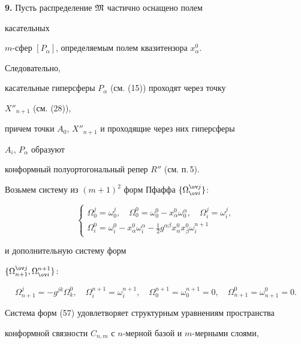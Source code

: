  


{\bf 9.} Пусть распределение $\frak M$ частично оснащено полем 


касательных 


$m$-сфер $[P_\alpha]$, определяемым полем квазитензора $x^0_\alpha$. 


Следовательно, 


касательные гиперсферы $P_\alpha$ (см. (15)) проходят через точку 


$X''_{n+1}$ (см. (28)), 


причем точки $A_0$, $X''_{n+1}$ и проходящие через них гиперсферы 


$A_i$, $P_\alpha$ образуют 


конформный полуортогональный репер $R''$ (см. п.\,5). 


 


Возьмем систему из $(m+1)^2$ форм Пфаффа $\{\Omega^{\ov j}_{\ov i}\}$: 


\begin{equation} 


\begin{cases} 


\Omega^j_0=\omega^j_0,\quad \Omega^0_0=\omega^0_0- 


x^0_\alpha\omega^\alpha_0,\quad \Omega^j_i=\omega^j_i, \\ 


\Omega^0_i=\omega^0_i-x^0_\alpha\omega^\alpha_i-\frac{1}{2} 


g^{\alpha\beta}x^0_\alpha x^0_\beta\omega^{n+1}_i 


\end{cases} 


\end{equation} 


и дополнительную систему форм 


$\{\Omega^{\ov j}_{n+1},\Omega^{n+1}_{\ov i}\}$: 


$$


\Omega^j_{n+1}=-g^{j k}\Omega^0_k,\quad 


\Omega^{n+1}_i=\omega^{n+1}_i,\quad 


\Omega^{n+1}_0=\omega^{n+1}_0=0,\quad 


\Omega^0_{n+1}=\omega^0_{n+1}=0. 


$$


Система форм (57) удовлетворяет структурным уравнениям пространства 


конформной связности $C_{n,m}$ с $n$-мерной базой и $m$-мерными слоями, 


